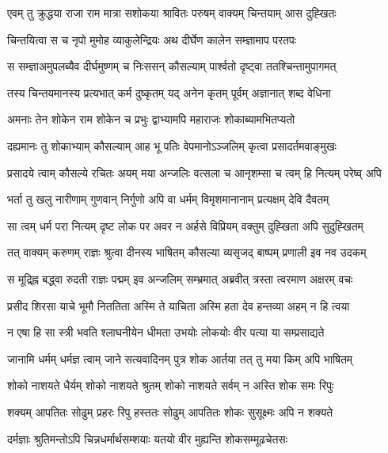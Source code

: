 
\twolineshloka
{एवम् तु क्रुद्धया राजा राम मात्रा सशोकया}
{श्रावितः परुषम् वाक्यम् चिन्तयाम् आस दुह्खितः} %

\twolineshloka
{चिन्तयित्वा स च नृपो मुमोह व्याकुलेन्द्रियः}
{अथ दीर्घेण कालेन सम्ज्ञामाप परतपः} %

\twolineshloka
{स सम्ज्ञाअमुपलब्यैव दीर्घमुष्णम् च निःससन्}
{कौसल्याम् पार्श्वतो दृष्ट्वा ततश्चिन्तामुपागमत्} %

\twolineshloka
{तस्य चिन्तयमानस्य प्रत्यभात् कर्म दुष्कृतम्}
{यद् अनेन कृतम् पूर्वम् अज्ञानात् शब्द वेधिना} %

\twolineshloka
{अमनाः तेन शोकेन राम शोकेन च प्रभुः}
{द्वाभ्यामपि महाराजः शोकाब्यामभितप्यतो} %

\twolineshloka
{दह्यमानः तु शोकाभ्याम् कौसल्याम् आह भू पतिः}
{वेपमानोऽञ्जलिम् कृत्वा प्रसादर्तमवाङ्मुखः} %

\twolineshloka
{प्रसादये त्वाम् कौसल्ये रचितः अयम् मया अन्जलिः}
{वत्सला च आनृशम्सा च त्वम् हि नित्यम् परेष्व् अपि} %

\twolineshloka
{भर्ता तु खलु नारीणाम् गुणवान् निर्गुणो अपि वा}
{धर्मम् विमृशमानानाम् प्रत्यक्षम् देवि दैवतम्} %

\twolineshloka
{सा त्वम् धर्म परा नित्यम् दृष्ट लोक पर अवर}
{न अर्हसे विप्रियम् वक्तुम् दुह्खिता अपि सुदुह्खितम्} %

\twolineshloka
{तत् वाक्यम् करुणम् राज्ञः श्रुत्वा दीनस्य भाषितम्}
{कौसल्या व्यसृजद् बाष्पम् प्रणाली इव नव उदकम्} %

\twolineshloka
{स मूद्र्ह्नि बद्ध्वा रुदती राज्ञः पद्मम् इव अन्जलिम्}
{सम्भ्रमात् अब्रवीत् त्रस्ता त्वरमाण अक्षरम् वचः} %

\twolineshloka
{प्रसीद शिरसा याचे भूमौ निततिता अस्मि ते}
{याचिता अस्मि हता देव हन्तव्या अहम् न हि त्वया} %

\twolineshloka
{न एषा हि सा स्त्री भवति श्लाघनीयेन धीमता}
{उभयोः लोकयोः वीर पत्या या सम्प्रसाद्यते} %

\twolineshloka
{जानामि धर्मम् धर्मज्ञ त्वाम् जाने सत्यवादिनम्}
{पुत्र शोक आर्तया तत् तु मया किम् अपि भाषितम्} %

\twolineshloka
{शोको नाशयते धैर्यम् शोको नाशयते श्रुतम्}
{शोको नाशयते सर्वम् न अस्ति शोक समः रिपुः} %

\twolineshloka
{शक्यम् आपतितः सोढुम् प्रहरः रिपु हस्ततः}
{सोढुम् आपतितः शोकः सुसूक्ष्मः अपि न शक्यते} %

\twolineshloka
{दर्मज्ञाः श्रुतिमन्तोऽपि चिन्नधर्मार्थसम्शयाः}
{यतयो वीर मुह्यन्ति शोकसम्मूढचेतसः} %


